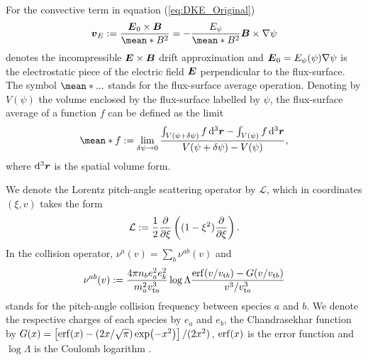 \documentclass[10pt]{iopart}
\newcommand{\Lorentz}{\mathcal{L}}
\begin{document}
For the convective term in equation (\ref{eq:DKE_Original})
%
\begin{align}
	\vb*{v}_E 
	:= 
	\frac{\vb*{E}_0\times\vb*{B}}{\mean*{B^2}} 
	= 
	- 
	\frac{E_\psi}{\mean*{B^2}}\vb*{B}\times \nabla\psi
	\label{eq:Incompressible_ExB_definition}
\end{align}
denotes the incompressible $\vb*{E}\times\vb*{B}$ drift approximation \cite{dherbemont2022} and $\vb*{E}_0 = E_\psi(\psi) \nabla \psi$ is the electrostatic piece of the electric field $\vb*{E}$ perpendicular to the flux-surface. The symbol $\mean*{...}$ stands for the flux-surface average operation. Denoting by $V(\psi)$ the volume enclosed by the flux-surface labelled by $\psi$, the flux-surface average of a function $f$ can be defined as the limit
%
\begin{align}
	\mean*{f}
	:=
	\lim_{\delta \psi \rightarrow 0} 
	\dfrac{\int_{V(\psi+\delta\psi)} f \dd[3]{\vb*{r}}- \int_{V(\psi)} f\dd[3]{\vb*{r}}}
	{V(\psi+\delta\psi) - V(\psi)},
	\label{eq:FSA}
\end{align}
where $\dd[3]{\vb*{r}}$ is the spatial volume form.

We denote the Lorentz pitch-angle scattering operator by $\Lorentz$, which in coordinates $(\xi,v)$ takes the form
\begin{align}
	\Lorentz   := \frac{1}{2}  \pdv{\xi}\left( (1-\xi^2)\pdv{}{\xi} \right).
	\label{eq:Pitch_angle_scattering_operator}
\end{align}
In the collision operator, $\nu^a(v) =\sum_{b}\nu^{ab}(v)$ and
%
\begin{align}
	\nu^{ab}(v) := 
	\frac{4 \pi n_b e_a^2 e_b^2}
	{m_a^2 v_{\text{t}a}^3}
	\log\Lambda
	\frac{ \erf(v/v_{\text{t}b}) - G(v/v_{\text{t}b})}{v^3/v_{\text{t}a}^3}
\end{align}
stands for the pitch-angle collision frequency between species $a$ and $b$. We denote the respective charges of each species by $e_a$ and $e_b$, the Chandrasekhar function by $G(x)=\left[\erf(x) - (2x/\sqrt{\pi}) \exp(-x^2)\right]/(2x^2)$, $\erf(x)$ is the error function and $\log\Lambda$ is the Coulomb logarithm \cite{Helander_2005}. 
\end{document}
